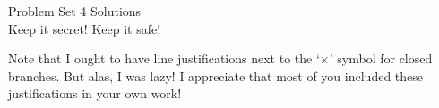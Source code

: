 \documentclass[12pt]{article}
\begin{document}


\iffalse
\parindent = 0pt
\hspace*{0.0in}\parbox[t]{2.5in}{
Philosophy 24.241\\[3pt]
Symbolic Logic\\[3pt]
Fall, 2022
}
\fi 


\iffalse 
\begin{center}
\Large\bf Problem Set 4 Solutions\\[1ex] 
 Keep it secret! Keep it safe!\\[3ex]
\end{center}
\fi

\begin{center}
\Large Problem Set 4 Solutions \\[1ex] 
 Keep it secret! Keep it safe! \\[1ex] 
\end{center}

\noindent Note that I ought to have line justifications next to the `$\times$' symbol for closed branches. But alas, I was lazy! I appreciate that most of you included these justifications in your own work! \\


\end{document}
